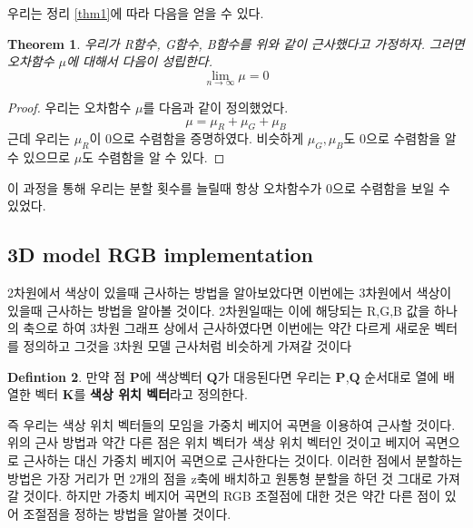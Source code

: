 \documentclass{gshs_thesis}
\theoremstyle{theorem}
\newtheorem{theorem}{Theorem}[section]
\theoremstyle{lemma}
\theoremstyle{definition}
\newtheorem{definition}[theorem]{Defintion}
\begin{document}
우리는 정리 \ref{thm1}에 따라 다음을 얻을 수 있다.
\begin{theorem}
	우리가 R함수, G함수, B함수를 위와 같이 근사했다고 가정하자. 그러면 오차함수 $\mu$에 대해서 다음이 성립한다. 
	\begin{equation*}
		\lim_{n\to\infty}\mu=0
	\end{equation*}
\end{theorem}
\begin{proof}
	우리는 오차함수 $\mu$를 다음과 같이 정의했었다. 
		\begin{equation*}
		 \mu=\mu_{R}+\mu_{G}+\mu_{B}
	    \end{equation*}
    근데 우리는 $\mu_{R}$이 0으로 수렴함을 증명하였다. 비슷하게 $\mu_{G},\mu_{B}$도 0으로 수렴함을 알 수 있으므로 $\mu$도 수렴함을 알 수 있다.
\end{proof}
이 과정을 통해 우리는 분할 횟수를 늘릴때 항상 오차함수가 0으로 수렴함을 보일 수 있었다.
\subsection{3D model RGB implementation}
2차원에서 색상이 있을때 근사하는 방법을 알아보았다면 이번에는 3차원에서 색상이 있을때 근사하는 방법을 알아볼 것이다. 2차원일때는 이에 해당되는 R,G,B 값을 하나의 축으로 하여 3차원 그래프 상에서 근사하였다면 이번에는 약간 다르게 새로운 벡터를 정의하고 그것을 3차원 모델 근사처럼 비슷하게 가져갈 것이다
\begin{definition}
	만약 점 $\textbf{P}$에 색상벡터 $\textbf{Q}$가 대응된다면 우리는 $\textbf{P}$,$\textbf{Q}$ 순서대로 열에 배열한 벡터 $\textbf{K}$를 \textbf{색상 위치 벡터}라고 정의한다.
\end{definition}
즉 우리는 색상 위치 벡터들의 모임을 가중치 베지어 곡면을 이용하여 근사할 것이다. 
위의 근사 방법과 약간 다른 점은 위치 벡터가 색상 위치 벡터인 것이고 베지어 곡면으로 근사하는 대신 가중치 베지어 곡면으로 근사한다는 것이다. 
이러한 점에서 분할하는 방법은 가장 거리가 먼 2개의 점을 z축에 배치하고 원통형 분할을 하던 것 그대로 가져갈 것이다. 하지만 가중치 베지어 곡면의 RGB 조절점에 대한 것은 약간 다른 점이 있어 조절점을 정하는 방법을 알아볼 것이다.
\end{document}
